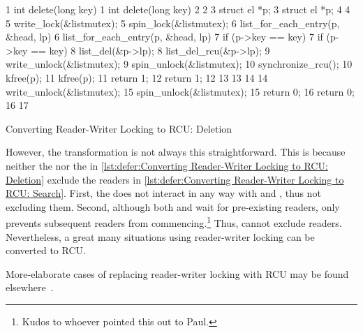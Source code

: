 \begin{listing*}
{ \scriptsize
\begin{verbbox}
 1 int delete(long key)                  1 int delete(long key)
 2 {                                     2 {
 3   struct el *p;                       3   struct el *p;
 4                                       4
 5   write_lock(&listmutex);             5   spin_lock(&listmutex);
 6   list_for_each_entry(p, &head, lp) { 6   list_for_each_entry(p, &head, lp) {
 7     if (p->key == key) {              7     if (p->key == key) {
 8       list_del(&p->lp);               8       list_del_rcu(&p->lp);
 9       write_unlock(&listmutex);       9       spin_unlock(&listmutex);
                                        10       synchronize_rcu();
10       kfree(p);                      11       kfree(p);
11       return 1;                      12       return 1;
12     }                                13     }
13   }                                  14   }
14   write_unlock(&listmutex);          15   spin_unlock(&listmutex);
15   return 0;                          16   return 0;
16 }                                    17 }
\end{verbbox}
}
\hspace*{0.9in}\OneColumnHSpace{-0.5in}
\IfEbookSize{\hspace*{-1.05in}}{}\theverbbox
\caption{Converting Reader-Writer Locking to RCU\@:
						    Deletion}
\label{lst:defer:Converting Reader-Writer Locking to RCU: Deletion}
\end{listing*}

However, the transformation is not always this straightforward.
This is because neither the  nor the
 in
\cref{lst:defer:Converting Reader-Writer Locking to RCU: Deletion}
exclude the readers in
\cref{lst:defer:Converting Reader-Writer Locking to RCU: Search}.
First, the  does not interact in any way with
 and , thus not excluding them.
Second, although both  and 
wait for pre-existing readers, only  prevents
subsequent readers from commencing.\footnote{
	Kudos to whoever pointed this out to Paul.}
Thus,  cannot exclude readers.
Nevertheless, a great many situations using reader-writer locking can
be converted to RCU\@.

More-elaborate cases of replacing reader-writer locking with RCU
may be found
elsewhere~\cite{NeilBrown2015PathnameLookup,NeilBrown2015RCUwalk}.

